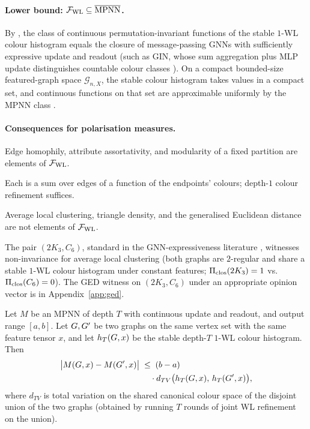 \paragraph{Lower bound: $\mathcal{F}_{\mathrm{WL}} \subseteq \overline{\mathrm{MPNN}}$.}
By \citet{ChenVillar2019}, the class of continuous permutation-invariant
functions of the stable $1$-WL colour histogram equals the closure of
message-passing GNNs with sufficiently expressive update and readout
(such as GIN, whose sum aggregation plus MLP update distinguishes
countable colour classes \citep{XuGIN2019}). On a compact bounded-size
featured-graph space $\mathcal{G}_{n,X}$, the stable colour histogram
takes values in a compact set, and continuous functions on that set
are approximable uniformly by the MPNN class \citep{AzizianLelarge2021}.

\paragraph{Consequences for polarisation measures.}

\begin{proposition}\label{prop:computable}
Edge homophily, attribute assortativity, and modularity of a
fixed partition are elements of $\mathcal{F}_{\mathrm{WL}}$.
\end{proposition}

Each is a sum over edges of a function of the endpoints' colours;
depth-$1$ colour refinement suffices.

\begin{proposition}\label{prop:noncomputable}
Average local clustering, triangle density, and the generalised
Euclidean distance are not elements of $\mathcal{F}_{\mathrm{WL}}$.
\end{proposition}

The pair $(2K_3, C_6)$, standard in the GNN-expressiveness
literature \citep{ChenVillar2019, XuGIN2019}, witnesses
non-invariance for average local clustering (both graphs are
$2$-regular and share a stable $1$-WL colour histogram under
constant features; $\Pi_{\mathrm{clos}}(2K_3) = 1$ vs. $\Pi_{\mathrm{clos}}(C_6)
= 0$). The GED witness on $(2K_3, C_6)$ under an appropriate
opinion vector is in Appendix~\ref{app:ged}.

\begin{proposition}\label{prop:rewire-bound}
Let $M$ be an MPNN of depth $T$ with continuous update and
readout, and output range $[a, b]$. Let $G, G'$ be two
graphs on the same vertex set with the same feature tensor $x$,
and let $h_T(G, x)$ be the stable depth-$T$ $1$-WL colour
histogram. Then
\begin{align*}
\bigl|M(G, x) - M(G', x)\bigr|
\;&\le\; (b - a) \\
&\quad\cdot d_{TV}\bigl(h_T(G, x),\, h_T(G', x)\bigr),
\end{align*}
where $d_{TV}$ is total variation on the shared canonical
colour space of the disjoint union of the two graphs (obtained
by running $T$ rounds of joint WL refinement on the union).
\end{proposition}

